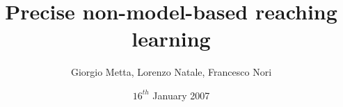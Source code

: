 \title {Precise non-model-based reaching learning}
\author{Giorgio Metta, Lorenzo Natale, Francesco Nori}
\date{$16^{th}$ January 2007}
\maketitle